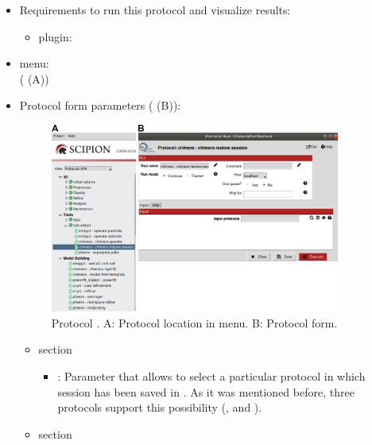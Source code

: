  \begin{itemize}
  \item Requirements to run this protocol and visualize results:
    \begin{itemize}
        \item \scipion plugin: 
    \end{itemize}
  \item \scipion menu:\\
    ( (A))
  
  \item Protocol form parameters ( (B)):
  
    \begin{figure}[H]
     \centering 
     \captionsetup{width=.7\linewidth} 
     \includegraphics[width=0.90\textwidth]{Images_appendix/Fig118.pdf}
     \caption{Protocol . A: Protocol location in \scipion menu. B: Protocol form.}
     \label{fig:app_protocol_chimera_3}
    \end{figure}
    
    \begin{itemize}
     \item {} section

    \begin{itemize}
     \item {}: Parameter that allows to select a particular protocol in which \chimera session has been saved in \scipion. As it was mentioned before, three protocols support this possibility (\chimera {}, \chimera {} and \chimera {}).
     
    \end{itemize}
    \item {} section
    

\end{itemize}
\end{itemize}
